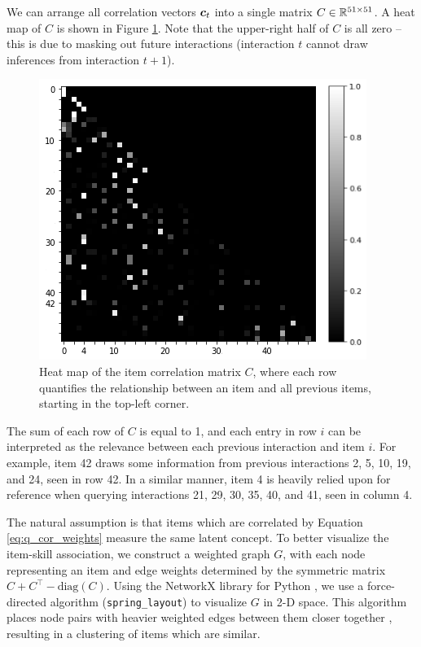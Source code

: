 We can arrange all correlation vectors $\boldsymbol{c}_t$ into a single matrix $C \in \mathbb{R}^{51 \times 51}$. A heat map of $C$ is shown in Figure \ref{fig:attn_item_cor}. Note that the upper-right half of $C$ is all zero -- this is due to masking out future interactions (interaction $t$ cannot draw inferences from interaction $t+1$).
\begin{figure}[h]
  \centering
  \includegraphics[width=.65\textwidth]{img/kt_irt/synth5_attn_weights_no_ffn_axis2.png}
  \caption{Heat map of the item correlation matrix $C$, where each row quantifies the relationship between an item and all previous items, starting in the top-left corner.}
  \label{fig:attn_item_cor}
\end{figure}
The sum of each row of $C$ is equal to 1, and each entry in row $i$ can be interpreted as the relevance between each previous interaction and item $i$. For example, item 42 draws some information from previous interactions 2, 5, 10, 19, and 24, seen in row 42. In a similar manner, item 4 is heavily relied upon for reference when querying interactions 21, 29, 30, 35, 40, and 41, seen in column 4.

The natural assumption is that items which are correlated by Equation \ref{eq:q_cor_weights} measure the same latent concept. To better visualize the item-skill association, we construct a weighted graph $G$, with each node representing an item and edge weights determined by the symmetric matrix $C + C^\top - \text{diag}(C)$. Using the NetworkX library for Python \cite{networkx}, we use a force-directed algorithm (\verb!spring_layout!) to visualize $G$ in 2-D space. This algorithm places node pairs with heavier weighted edges between them closer together \cite{fruchterman1991}, resulting in a clustering of items which are similar.

